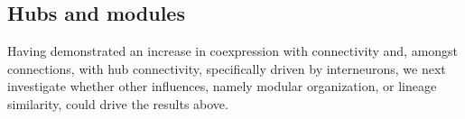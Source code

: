 \documentclass[10pt,letterpaper]{article}
\begin{document}
\subsection*{Hubs and modules}
Having demonstrated an increase in coexpression with connectivity and, amongst connections, with hub connectivity, specifically driven by interneurons, we next investigate whether other influences, namely modular organization, or lineage similarity, could drive the results above.


\end{document}
